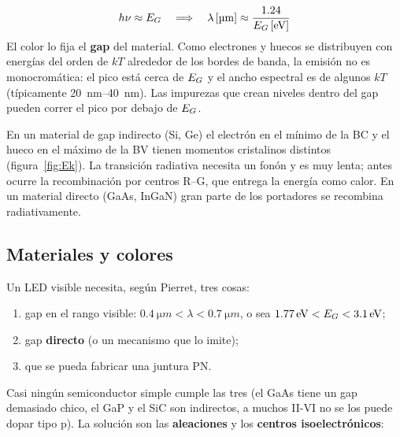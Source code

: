 \begin{clave}
\[
  h\nu \approx \EG \quad\Longrightarrow\quad \lambda\,[\si{\micro m}]\approx\frac{1.24}{\EG\,[\si{\eV}]}
\]
El color lo fija el \textbf{gap} del material. Como electrones y huecos se distribuyen
con energías del orden de $kT$ alrededor de los bordes de banda, la emisión no es
monocromática: el pico está cerca de $E_G$ y el ancho espectral es de algunos $kT$
(típicamente \SIrange{20}{40}{nm}). Las impurezas que crean niveles dentro del gap pueden
correr el pico por debajo de $E_G$.
\end{clave}

\begin{intuicion}
En un material de gap indirecto (Si, Ge) el electrón en el mínimo de la BC y el hueco en el
máximo de la BV tienen momentos cristalinos distintos (figura~\ref{fig:Ek}). La transición
radiativa necesita un fonón y es muy lenta; antes ocurre la recombinación por centros R--G,
que entrega la energía como calor. En un material directo (GaAs, InGaN) gran parte de los
portadores se recombina radiativamente.
\end{intuicion}

\subsection{Materiales y colores}

Un LED visible necesita, según Pierret, tres cosas:
\begin{enumerate}[nosep]
  \item gap en el rango visible: $\SI{0.4}{\micro m}<\lambda<\SI{0.7}{\micro m}$, o sea
  $\SI{1.77}{\eV}<\EG<\SI{3.1}{\eV}$;
  \item gap \textbf{directo} (o un mecanismo que lo imite);
  \item que se pueda fabricar una juntura PN.
\end{enumerate}
Casi ningún semiconductor simple cumple las tres (el GaAs tiene un gap demasiado chico, el
GaP y el SiC son indirectos, a muchos II-VI no se los puede dopar tipo p). La solución
son las \textbf{aleaciones} y los \textbf{centros isoelectrónicos}:

